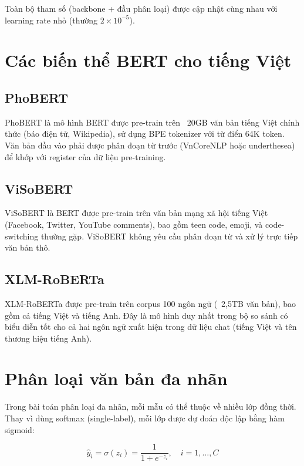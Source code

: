 \documentclass[12pt, a4paper]{report}
\begin{document}
Toàn bộ tham số (backbone + đầu phân loại) được cập nhật cùng nhau
với learning rate nhỏ (thường $2 \times 10^{-5}$).

\section{Các biến thể BERT cho tiếng Việt}

\subsection{PhoBERT}

PhoBERT \cite{nguyen2020phobert} là mô hình BERT được pre-train
trên ~20GB văn bản tiếng Việt chính thức (báo điện tử, Wikipedia),
sử dụng BPE tokenizer với từ điển 64K token.
Văn bản đầu vào phải được phân đoạn từ trước (VnCoreNLP hoặc underthesea)
để khớp với register của dữ liệu pre-training.

\subsection{ViSoBERT}

ViSoBERT \cite{visobert2023} là BERT được pre-train trên văn bản
mạng xã hội tiếng Việt (Facebook, Twitter, YouTube comments),
bao gồm teen code, emoji, và code-switching thường gặp.
ViSoBERT không yêu cầu phân đoạn từ và xử lý trực tiếp văn bản thô.

\subsection{XLM-RoBERTa}

XLM-RoBERTa \cite{conneau2020xlmr} được pre-train trên corpus
100 ngôn ngữ (~2,5TB văn bản), bao gồm cả tiếng Việt và tiếng Anh.
Đây là mô hình duy nhất trong bộ so sánh có biểu diễn tốt cho
cả hai ngôn ngữ xuất hiện trong dữ liệu chat (tiếng Việt và tên
thương hiệu tiếng Anh).

\section{Phân loại văn bản đa nhãn}

Trong bài toán phân loại đa nhãn, mỗi mẫu có thể thuộc về
nhiều lớp đồng thời. Thay vì dùng softmax (single-label),
mỗi lớp được dự đoán độc lập bằng hàm sigmoid:

\begin{equation}
  \hat{y}_i = \sigma(z_i) = \frac{1}{1 + e^{-z_i}}, \quad i = 1,\ldots,C
\end{equation}
\end{document}
